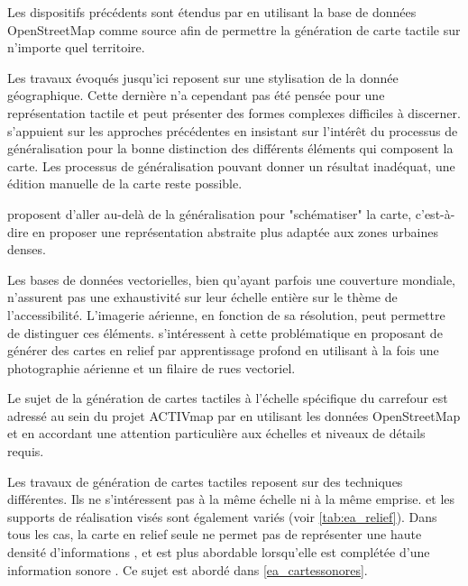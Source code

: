 Les dispositifs précédents sont étendus par \cite{Watanabe2014, Cervenka2016} en utilisant la base de données OpenStreetMap comme source afin de permettre la génération de carte tactile sur n'importe quel territoire.

\newpar{}

Les travaux évoqués jusqu'ici reposent sur une stylisation de la donnée géographique. Cette dernière n'a cependant pas été pensée pour une représentation tactile et peut présenter des formes complexes difficiles à discerner. \cite{Stampach2016} s'appuient sur les approches précédentes en insistant sur l’intérêt du processus de généralisation pour la bonne distinction des différents éléments qui composent la carte. Les processus de généralisation pouvant donner un résultat inadéquat, une édition manuelle de la carte reste possible.

\cite{Touya2019} proposent d'aller au-delà de la généralisation pour "schématiser" la carte, c'est-à-dire en proposer une représentation abstraite plus adaptée aux zones urbaines denses. 

\newpar{}

Les bases de données vectorielles, bien qu'ayant parfois une couverture mondiale, n'assurent pas une exhaustivité sur leur échelle entière sur le thème de l'accessibilité. L'imagerie aérienne, en fonction de sa résolution, peut permettre de distinguer ces éléments. \cite{FillieresRiveau2020} s'intéressent à cette problématique en proposant de générer des cartes en relief par apprentissage profond en utilisant à la fois une photographie aérienne et un filaire de rues vectoriel. 

\newpar{}

Le sujet de la génération de cartes tactiles à l'échelle spécifique du carrefour est adressé au sein du projet ACTIVmap par \cite{Jiang2023} en utilisant les données OpenStreetMap et en accordant une attention particulière aux échelles et niveaux de détails requis.

Les travaux de génération de cartes tactiles reposent sur des techniques différentes. Ils ne s'intéressent pas à la même échelle ni à la même emprise. et les supports de réalisation visés sont également variés (voir \ref{tab:ea_relief}). Dans tous les cas, la carte en relief seule ne permet pas de représenter une haute densité d'informations \cite{Touya2019}, et est plus abordable lorsqu'elle est complétée d'une information sonore \cite{Brock2015}. Ce sujet est abordé dans \ref{ea_cartessonores}.


